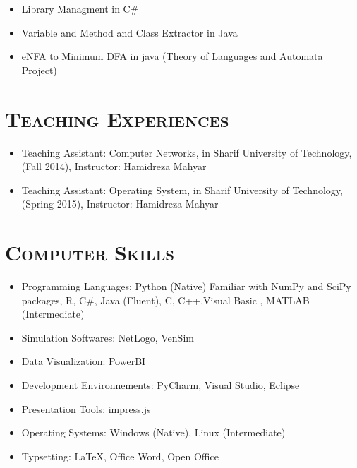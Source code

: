 \documentclass[line,margin]{res}
\begin{document}
\begin{resume}
\begin{spacing}{1.1}
\begin{itemize}
\item Library Managment in C\#
\item Variable and Method and Class Extractor in Java
\item eNFA to Minimum DFA in java (Theory of Languages and Automata Project)
\end{itemize}





\section{\textsc{Teaching Experiences}}
\begin{itemize}
\item  Teaching Assistant: Computer Networks, in Sharif University of Technology, (Fall 2014), Instructor:
Hamidreza Mahyar
\item Teaching Assistant: Operating System, in Sharif University of Technology, (Spring 2015), Instructor:
Hamidreza Mahyar
\end{itemize}

\section{\textsc{Computer
Skills}}
\begin{itemize}
\item  Programming Languages: Python (Native) Familiar with NumPy and SciPy packages, R, C\#, Java (Fluent), C, C++,Visual Basic , MATLAB (Intermediate)
\item Simulation Softwares: NetLogo, VenSim
\item Data Visualization: PowerBI
\item Development Environnements: PyCharm, Visual Studio, Eclipse
\item Presentation Tools: impress.js %
\item  Operating Systems: Windows (Native), Linux (Intermediate)
\item Typsetting: \LaTeX  , Office Word, Open Office
\end{itemize}


\end{spacing}
\end{resume}
\end{document}

